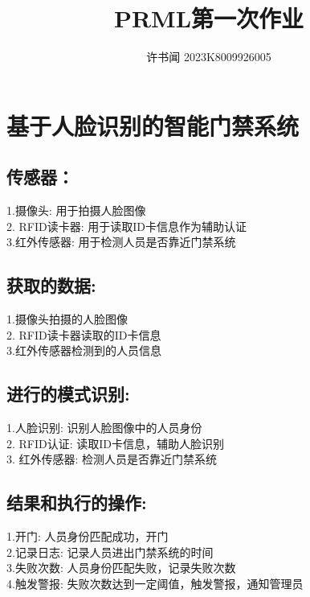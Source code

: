 \documentclass{article}
\begin{document}
\title{PRML第一次作业}
\author{许书闻 2023K8009926005}
\maketitle

\section{基于人脸识别的智能门禁系统}

\subsection{传感器：}
1.摄像头: 用于拍摄人脸图像\\
2. RFID读卡器: 用于读取ID卡信息作为辅助认证\\
3.红外传感器: 用于检测人员是否靠近门禁系统\\
\subsection{获取的数据:}
1.摄像头拍摄的人脸图像\\
2. RFID读卡器读取的ID卡信息\\
3.红外传感器检测到的人员信息\\
\subsection{进行的模式识别:}
1.人脸识别: 识别人脸图像中的人员身份\\
2. RFID认证: 读取ID卡信息，辅助人脸识别\\
3. 红外传感器: 检测人员是否靠近门禁系统\\
\subsection{结果和执行的操作:}
1.开门: 人员身份匹配成功，开门\\
2.记录日志: 记录人员进出门禁系统的时间\\
3.失败次数: 人员身份匹配失败，记录失败次数\\
4.触发警报: 失败次数达到一定阈值，触发警报，通知管理员\\
\end{document}
